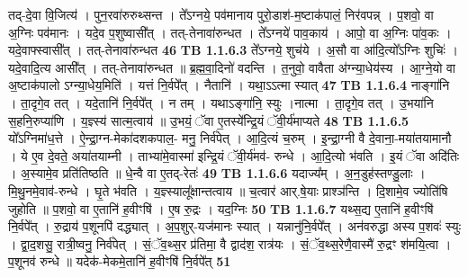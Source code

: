 \documentclass[17pt]{extarticle}
\begin{document}
                  तद्-दे॒वा वि॒जित्य॑ । पुन॒रवा॑रुरुथ्सन्त । ते᳚ऽग्नये॒ पव॑मानाय पुरो॒डाश॑-म॒ष्टाक॑पालं॒ निर॑वपन्न् । प॒शवो॒ वा अ॒ग्निः पव॑मानः । यदे॒व प॒शुष्वासी᳚त् । तत्-तेनावा॑रुन्धत । ते᳚ऽग्नये॑ पाव॒काय॑ । आपो॒ वा अ॒ग्निः पा॑व॒कः । यदे॒वाफ्स्वासी᳚त् । तत्-तेनावा॑रुन्धत \textbf{ 46} \newline
                  \newline
                                \textbf{ TB 1.1.6.3} \newline
                  ते᳚ऽग्नये॒ शुच॑ये । अ॒सौ वा आ॑दि॒त्यो᳚ऽग्निः शुचिः॑ । यदे॒वादि॒त्य आसी᳚त् । तत्-तेनावा॑रुन्धत ॥ ब्र॒ह्म॒वा॒दिनो॑ वदन्ति । त॒नुवो॒ वावैता अ॑ग्न्या॒धेय॑स्य । आ॒ग्ने॒यो वा अ॒ष्टाक॑पालो ऽग्न्या॒धेय॒मिति॑ । यत्तं नि॒र्वपे᳚त् । नैतानि॑ । यथा॒ऽऽत्मा स्यात् \textbf{ 47} \newline
                  \newline
                                \textbf{ TB 1.1.6.4} \newline
                  नाङ्गा॑नि । ता॒दृगे॒व तत् । यदे॒तानि॑ नि॒र्वपे᳚त् । न तम् । यथाऽङ्गा॑नि॒ स्युः ।नात्मा । ता॒दृगे॒व तत् । उ॒भया॑नि स॒हनि॒रुप्या॑णि । य॒ज्ञ्स्य॑ सात्म॒त्वाय॑ ॥ उ॒भयं॒ ॅवा ए॒तस्ये᳚न्द्रि॒यं ॅवी॒र्य॑माप्यते \textbf{ 48} \newline
                  \newline
                                \textbf{ TB 1.1.6.5} \newline
                  यो᳚ऽग्निमा॑ध॒त्ते । ऐ॒न्द्रा॒ग्न-मेका॑दशकपाल॒- मनु॒ निर्व॑पेत् । आ॒दि॒त्यं च॒रुम् । इ॒न्द्रा॒ग्नी वै दे॒वाना॒-मया॑तयामानौ । ये ए॒व दे॒वते॒ अया॑तयाम्नी । ताभ्या॑मे॒वास्मा॑ इन्द्रि॒यं ॅवी॒र्य॑मव॑- रुन्धे । आ॒दि॒त्यो भ॑वति । इ॒यं ॅवा अदि॑तिः । अ॒स्यामे॒व प्रति॑तिष्ठति ॥ धे॒न्वै वा ए॒तद्-रेतः॑ \textbf{ 49} \newline
                  \newline
                                \textbf{ TB 1.1.6.6} \newline
                  यदाज्य᳚म् । अ॒न॒डुह॑स्तण्डु॒लाः । मि॒थु॒नमे॒वाव॑-रुन्धे । घृ॒ते भ॑वति । य॒ज्ञ्स्यालू᳚क्षान्तत्वाय ॥ च॒त्वार॑ आर्.षे॒याः प्राश्ञ॑न्ति । दि॒शामे॒व ज्योति॑षि जुहोति ॥ प॒शवो॒ वा ए॒तानि॑ ह॒वीꣳषि॑ । ए॒ष रु॒द्रः । यद॒ग्निः \textbf{ 50} \newline
                  \newline
                                \textbf{ TB 1.1.6.7} \newline
                  यथ्स॒द्य ए॒तानि॑ ह॒वीꣳषि॑ नि॒र्वपे᳚त् । रु॒द्राय॑ प॒शूनपि॑ दद्ध्यात् । अ॒प॒शुर्-यज॑मानः स्यात् । यन्नानु॑नि॒र्वपे᳚त् । अन॑वरुद्धा अस्य प॒शवः॑ स्युः । द्वा॒द॒शसु॒ रात्री॒ष्वनु॒ निर्व॑पेत् । सं॒ॅव॒थ्स॒र प्र॑तिमा॒ वै द्वाद॑श॒ रात्र॑यः । सं॒ॅव॒थ्स॒रेणै॒वास्मै॑ रु॒द्रꣳ श॑मयि॒त्वा । प॒शूनव॑ रुन्धे ॥ यदेक॑-मेकमे॒तानि॑ ह॒वीꣳषि॑ नि॒र्वपे᳚त् \textbf{ 51} \newline
\end{document}
